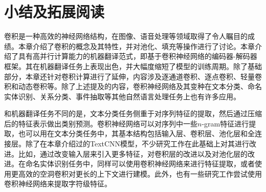 
\section{小结及拓展阅读}

\parinterval 卷积是一种高效的神经网络结构，在图像、语音处理等领域取得了令人瞩目的成绩。本章介绍了卷积的概念及其特性，并对池化、填充等操作进行了讨论。本章介绍了具有高并行计算能力的机器翻译范式，即基于卷积神经网络的编码器-解码器框架。其在机器翻译任务上表现出色，并大幅度缩短了模型的训练周期。除了基础部分，本章还针对卷积计算进行了延伸，内容涉及逐通道卷积、逐点卷积、轻量卷积和动态卷积等。除了上述提及的内容，卷积神经网络及其变种在文本分类、命名实体识别、关系分类、事件抽取等其他自然语言处理任务上也有许多应用。

\parinterval 和机器翻译任务不同的是，文本分类任务侧重于对序列特征的提取，然后通过压缩后的特征表示做出类别预测。卷积神经网络可以对序列中一些$n$-gram特征进行提取，也可以用在文本分类任务中，其基本结构包括输入层、卷积层、池化层和全连接层。除了在本章介绍过的TextCNN模型，不少研究工作在此基础上对其进行改进。比如，通过改变输入层来引入更多特征，对卷积层的改进以及对池化层的改进。在命名实体识别任务中，同样可以使用卷积神经网络来进行特征提取，或者使用更高效的空洞卷积对更长的上下文进行建模。此外，也有一些研究工作尝试使用卷积神经网络来提取字符级特征。









